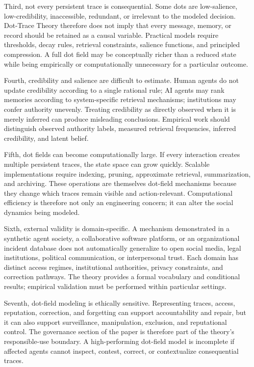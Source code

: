 \documentclass[11pt]{article}
\theoremstyle{remark}
\begin{document}
Third, not every persistent trace is consequential. Some dots are low-salience, low-credibility, inaccessible, redundant, or irrelevant to the modeled decision. Dot-Trace Theory therefore does not imply that every message, memory, or record should be retained as a causal variable. Practical models require thresholds, decay rules, retrieval constraints, salience functions, and principled compression. A full dot field may be conceptually richer than a reduced state while being empirically or computationally unnecessary for a particular outcome.

Fourth, credibility and salience are difficult to estimate. Human agents do not update credibility according to a single rational rule; AI agents may rank memories according to system-specific retrieval mechanisms; institutions may confer authority unevenly. Treating credibility as directly observed when it is merely inferred can produce misleading conclusions. Empirical work should distinguish observed authority labels, measured retrieval frequencies, inferred credibility, and latent belief.

Fifth, dot fields can become computationally large. If every interaction creates multiple persistent traces, the state space can grow quickly. Scalable implementations require indexing, pruning, approximate retrieval, summarization, and archiving. These operations are themselves dot-field mechanisms because they change which traces remain visible and action-relevant. Computational efficiency is therefore not only an engineering concern; it can alter the social dynamics being modeled.

Sixth, external validity is domain-specific. A mechanism demonstrated in a synthetic agent society, a collaborative software platform, or an organizational incident database does not automatically generalize to open social media, legal institutions, political communication, or interpersonal trust. Each domain has distinct access regimes, institutional authorities, privacy constraints, and correction pathways. The theory provides a formal vocabulary and conditional results; empirical validation must be performed within particular settings.

Seventh, dot-field modeling is ethically sensitive. Representing traces, access, reputation, correction, and forgetting can support accountability and repair, but it can also support surveillance, manipulation, exclusion, and reputational control. The governance section of the paper is therefore part of the theory's responsible-use boundary. A high-performing dot-field model is incomplete if affected agents cannot inspect, contest, correct, or contextualize consequential traces.
\end{document}
